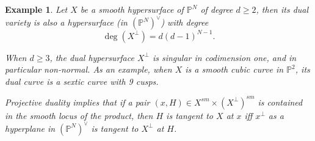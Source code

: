 \documentclass[12pt]{amsart}
\newcommand{\C}{\mathbb{C}} %
\newtheorem{example}[theorem]{Example}
\begin{document}

\begin{example}\normalfont
    Let $X$ be a smooth hypersurface of $\mathbb P^{N}$ of degree $d\ge 2$, then its dual variety is also a hypersurface (in $(\mathbb P^N)^{\vee}$) with degree \cite[Proposition 2.9]{EisHar16}
    \begin{equation}\label{eqn_deg(X-dual)}
        \deg(X^{\perp})=d(d-1)^{N-1}.
    \end{equation}
       
  When $d\ge 3$, the dual hypersurface $X^{\perp}$ is singular in codimension one, and in particular non-normal. As an example, when $X$ is a smooth cubic curve in $\mathbb P^2$, its dual curve is a sextic curve with 9 cusps. 
  
    Projective duality implies that if a pair $(x,H)\in X^{sm}\times (X^{\perp})^{sm}$ is contained in the smooth locus of the product, then $H$ is tangent to $X$ at $x$ iff $x^{\perp}$ as a hyperplane in $(\mathbb P^N)^{\vee}$ is tangent to $X^{\perp}$ at $H$.
 
\end{example}
\end{document}

